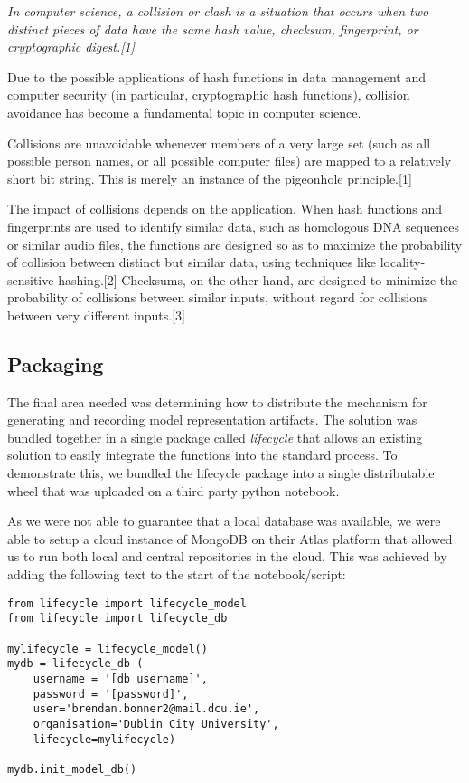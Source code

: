 { \itshape
In computer science, a collision or clash is a situation that occurs when two distinct pieces of data have the same hash value, checksum, fingerprint, or cryptographic digest.[1]

Due to the possible applications of hash functions in data management and computer security (in particular, cryptographic hash functions), collision avoidance has become a fundamental topic in computer science.

Collisions are unavoidable whenever members of a very large set (such as all possible person names, or all possible computer files) are mapped to a relatively short bit string. This is merely an instance of the pigeonhole principle.[1]

The impact of collisions depends on the application. When hash functions and fingerprints are used to identify similar data, such as homologous DNA sequences or similar audio files, the functions are designed so as to maximize the probability of collision between distinct but similar data, using techniques like locality-sensitive hashing.[2] Checksums, on the other hand, are designed to minimize the probability of collisions between similar inputs, without regard for collisions between very different inputs.[3]
}


\subsection{Packaging}

The final area needed was determining how to distribute the mechanism for generating and recording model representation artifacts. The solution was bundled together in a single package called \textit{lifecycle} that allows an existing solution to easily integrate the functions into the standard process. To demonstrate this, we bundled the lifecycle package into a single distributable wheel that was uploaded on a third party python notebook.

As we were not able to guarantee that a local database was available, we were able to setup a cloud instance of MongoDB on their Atlas platform that allowed us to run both local and central repositories in the cloud. This was achieved by adding the following text to the start of the notebook/script:

\begin{lstlisting}
from lifecycle import lifecycle_model
from lifecycle import lifecycle_db

mylifecycle = lifecycle_model()
mydb = lifecycle_db (
    username = '[db username]',
    password = '[password]',
    user='brendan.bonner2@mail.dcu.ie',
    organisation='Dublin City University',
    lifecycle=mylifecycle)

mydb.init_model_db()
\end{lstlisting}

